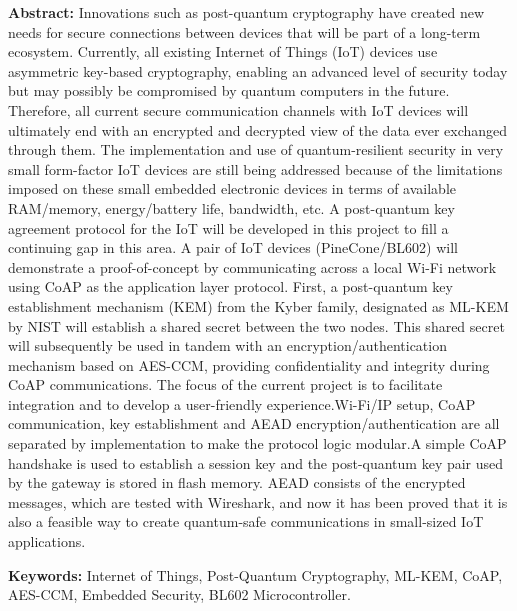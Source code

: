 \documentclass[a4paper]{scrartcl}
\title{\paperTitle}
\author{
Gaurav Rajashekar <g.rajashekar@stud.fh-sm.de>, 319097 \\
Prasanna Kondeti <p.kondeti@stud.fh-sm.de>, 319521 \\
Chandu Komme <c.komme@stud.fh-sm.de>, 319570 \\
Durga Prasad Puli <dp.puli@stud.fh-sm.de>, 317438 \\
Sunanda Komme <s.komme@stud.fh-sm.de>, 319822
}
\date{}
\begin{document}
	\maketitle
\noindent\textbf{Abstract:}
Innovations such as post-quantum cryptography have created new needs for secure connections between devices that will be part of a long-term ecosystem. Currently, all existing Internet of Things (IoT) devices use asymmetric key-based cryptography, enabling an advanced level of security today but may possibly be compromised by quantum computers in the future. Therefore, all current secure communication channels with IoT devices will ultimately end with an encrypted and decrypted view of the data ever exchanged through them. The implementation and use of quantum-resilient security in very small form-factor IoT devices are still being addressed because of the limitations imposed on these small embedded electronic devices in terms of available RAM/memory, energy/battery life, bandwidth, etc. A post-quantum key agreement protocol for the IoT will be developed in this project to fill a continuing gap in this area. A pair of IoT devices (PineCone/BL602) will demonstrate a proof-of-concept by communicating across a local Wi-Fi network using CoAP as the application layer protocol. First, a post-quantum key establishment mechanism (KEM) from the Kyber family, designated as ML-KEM by NIST will establish a shared secret between the two nodes. This shared secret will subsequently be used in tandem with an encryption/authentication mechanism based on AES-CCM, providing confidentiality and integrity during CoAP communications. The focus of the current project is to facilitate integration and to develop a user-friendly experience.Wi-Fi/IP setup, CoAP communication, key establishment and AEAD encryption/authentication are all separated by implementation to make the protocol logic modular.A simple CoAP handshake is used to establish a session key and the post-quantum key pair used by the gateway is stored in flash memory. AEAD consists of the encrypted messages, which are tested with Wireshark, and now it has been proved that it is also a feasible way to create quantum-safe communications in small-sized IoT applications.

 \textbf{Keywords:} Internet of Things, Post-Quantum Cryptography, ML-KEM,
CoAP, AES-CCM, Embedded Security, BL602 Microcontroller.

	
\end{document}
